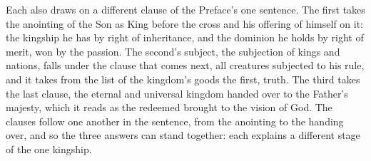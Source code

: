 Each also draws on a different clause of the Preface's one sentence. The
first takes the anointing of the Son as King before the cross and his
offering of himself on it: the kingship he has by right of inheritance, and
the dominion he holds by right of merit, won by the passion. The second's subject, the subjection of kings and nations, falls under
the clause that comes next, all creatures subjected to his rule, and it takes
from the list of the kingdom's goods the first, truth. The third takes the last
clause, the eternal and universal kingdom handed over to the Father's
majesty, which it reads as the redeemed brought to the vision of God. The
clauses follow one another in the sentence, from the anointing to the handing
over, and so the three answers can stand together: each explains a different
stage of the one kingship.
